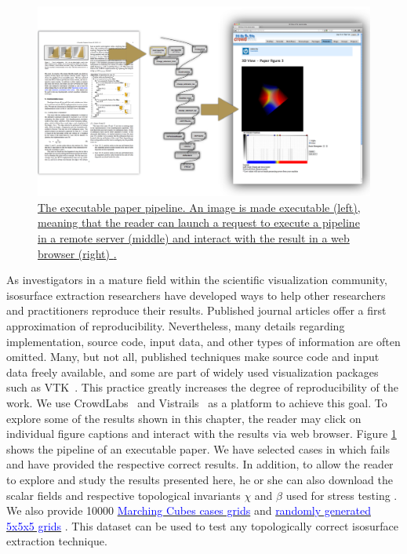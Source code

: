 \begin{figure}[b]
     \centering
    \includegraphics[width=0.7\linewidth]{chapter4/figures/executable.png}
     \caption{ \label{fig:executable}\href{http://liscustodio.github.io/C_MC33/index.html}{The executable paper pipeline. An image is made executable (left), meaning that the reader can launch a request to execute a pipeline in a remote server (middle) and interact with the result in a web browser (right) \cite{lisOnline2013}.}}
\end{figure}

As investigators in a mature field within the scientific visualization community, isosurface extraction researchers have developed ways to help other researchers and practitioners reproduce their results. Published journal articles offer a first approximation of reproducibility. Nevertheless, many details regarding implementation, source code, input data, and other types of information are often omitted. Many, but not all, published techniques make source code and input data freely available, and some are part of widely used visualization packages such as VTK~\cite{vtk}. This practice greatly increases the degree of reproducibility of the work. 
We use CrowdLabs~\cite{Tohline:2010jn} and Vistrails~\cite{Freire:2006va, Silva:2007:PVR:1300781.1302461} as a platform to achieve this goal. To explore some of the results shown in this chapter, the  reader may click on individual figure captions and interact with the results via web browser. Figure \ref{fig:executable} shows the pipeline of an executable paper. 
%
We have selected cases in which \mc{} fails and have provided the respective correct results. In addition,  to allow the reader to explore and study the results presented here, he or she can also download the scalar fields and respective topological invariants $\chi$ and $\beta$ used for stress testing \mc. We also provide 10000 \href{http://liscustodio.github.io/C_MC33/MarchingCubes_cases.zip}{\textcolor{blue}{Marching Cubes cases grids}} and \href{http://liscustodio.github.io/C_MC33/Closed_Surfaces.zip}{\textcolor{blue}{randomly generated 5x5x5 grids}} \cite{lisOnline2013}. This dataset can be used to test any topologically correct isosurface extraction technique.



